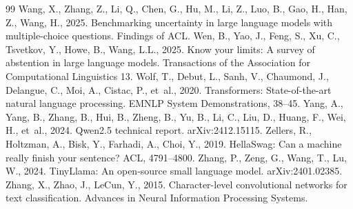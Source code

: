 \documentclass[preprint,12pt,authoryear]{elsarticle}
\begin{document}
\begin{thebibliography}{99}
 Wang, X., Zhang, Z., Li, Q., Chen, G., Hu, M., Li, Z., Luo, B., Gao, H., Han, Z., Wang, H., 2025. Benchmarking uncertainty in large language models with multiple-choice questions. Findings of ACL.
 Wen, B., Yao, J., Feng, S., Xu, C., Tsvetkov, Y., Howe, B., Wang, L.L., 2025. Know your limits: A survey of abstention in large language models. Transactions of the Association for Computational Linguistics 13.
 Wolf, T., Debut, L., Sanh, V., Chaumond, J., Delangue, C., Moi, A., Cistac, P., et~al., 2020. Transformers: State-of-the-art natural language processing. EMNLP System Demonstrations, 38--45.
 Yang, A., Yang, B., Zhang, B., Hui, B., Zheng, B., Yu, B., Li, C., Liu, D., Huang, F., Wei, H., et~al., 2024. Qwen2.5 technical report. arXiv:2412.15115.
 Zellers, R., Holtzman, A., Bisk, Y., Farhadi, A., Choi, Y., 2019. HellaSwag: Can a machine really finish your sentence? ACL, 4791--4800.
 Zhang, P., Zeng, G., Wang, T., Lu, W., 2024. TinyLlama: An open-source small language model. arXiv:2401.02385.
 Zhang, X., Zhao, J., LeCun, Y., 2015. Character-level convolutional networks for text classification. Advances in Neural Information Processing Systems.
\end{thebibliography}
\end{document}
